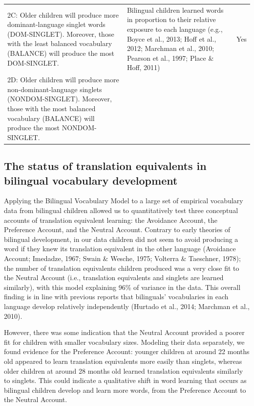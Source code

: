 \documentclass[
  english,
  ,man,floatsintext]{apa6}
\begin{document}
\begin{landscape}
\begin{table}
\begin{tabular}[t]{>{\raggedright\arraybackslash}p{200px}>{\raggedright\arraybackslash}p{250px}>{\centering\arraybackslash}p{150px}}
\addlinespace
2C: Older children will produce more dominant-language singlet words (DOM-SINGLET). Moreover, those with the least balanced vocabulary (BALANCE) will produce the most DOM-SINGLET. & Bilingual children learned words in proportion to their relative exposure to each language (e.g., Boyce et al., 2013; Hoff et al., 2012; Marchman et al., 2010; Pearson et al., 1997; Place \& Hoff, 2011) & Yes\\
2D: Older children will produce more non-dominant-language singlets (NONDOM-SINGLET). Moreover, those with the most balanced vocabulary (BALANCE) will produce the most NONDOM-SINGLET. &  & \\
\bottomrule
\end{tabular}
\end{table}
\end{landscape}

\hypertarget{the-status-of-translation-equivalents-in-bilingual-vocabulary-development}{%
\subsection{The status of translation equivalents in bilingual vocabulary development}\label{the-status-of-translation-equivalents-in-bilingual-vocabulary-development}}

Applying the Bilingual Vocabulary Model to a large set of empirical vocabulary data from bilingual children allowed us to quantitatively test three conceptual accounts of translation equivalent learning: the Avoidance Account, the Preference Account, and the Neutral Account. Contrary to early theories of bilingual development, in our data children did not seem to avoid producing a word if they knew its translation equivalent in the other language (Avoidance Account; Imedadze, 1967; Swain \& Wesche, 1975; Volterra \& Taeschner, 1978); the number of translation equivalents children produced was a very close fit to the Neutral Account (i.e., translation equivalents and singlets are learned similarly), with this model explaining 96\% of variance in the data. This overall finding is in line with previous reports that bilinguals' vocabularies in each language develop relatively independently (Hurtado et al., 2014; Marchman et al., 2010).

However, there was some indication that the Neutral Account provided a poorer fit for children with smaller vocabulary sizes. Modeling their data separately, we found evidence for the Preference Account: younger children at around 22 months old appeared to learn translation equivalents more easily than singlets, whereas older children at around 28 months old learned translation equivalents similarly to singlets. This could indicate a qualitative shift in word learning that occurs as bilingual children develop and learn more words, from the Preference Account to the Neutral Account.
\end{document}
